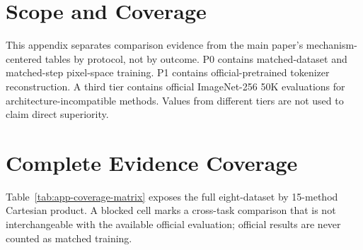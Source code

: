 \section{Scope and Coverage}

This appendix separates comparison evidence from the main paper's
mechanism-centered tables by protocol, not by outcome. P0 contains
matched-dataset and matched-step pixel-space training. P1 contains
official-pretrained tokenizer reconstruction. A third tier contains official
ImageNet-256 50K evaluations for architecture-incompatible methods. Values from
different tiers are not used to claim direct superiority.

\begin{table}[!ht]
  \centering
  \scriptsize
  \caption{Comparison protocols used throughout the paper and appendix.}
  \label{tab:app-protocol-map}
\end{table}

\section{Complete Evidence Coverage}

Table~\ref{tab:app-coverage-matrix} exposes the full eight-dataset by
15-method Cartesian product. A blocked cell marks a cross-task comparison that
is not interchangeable with the available official evaluation; official
results are never counted as matched training.

